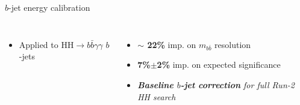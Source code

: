 \begin{frame}{$b$-jet energy calibration}
\begin{columns}
\begin{itemize}
    \item Applied to HH$\to b\bar{b}\gamma\gamma$ $b$-jets
\end{itemize}
\pause
{}
\begin{itemize}
    \item \textcolor{HHred}{\textbf{$\sim$ 22\%}} imp. on $m_{b \bar{b}}$ resolution
    \item \textcolor{HHred}{\textbf{7\%$\pm$2\%}} imp. on expected significance
    \item \textsl{\textbf{Baseline $b$-jet correction} for full Run-2 HH search}
\end{itemize}

\end{columns}    
\end{frame}


